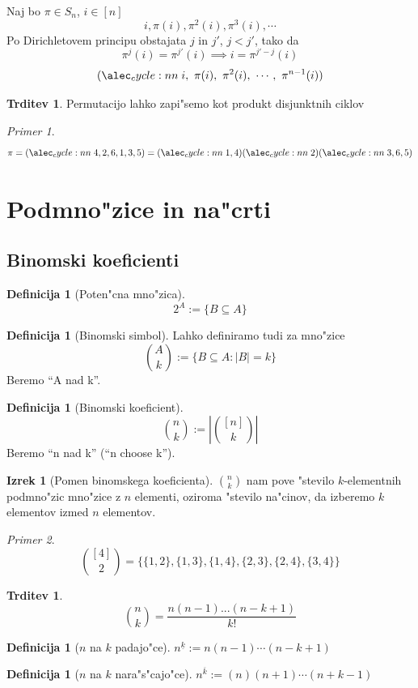 \documentclass[a4paper,12pt]{article}
\theoremstyle{definition}
\newtheorem{defn}[counter]{Definicija}
\newtheorem{claim}[counter]{Trditev}
\newtheorem{theorem}[counter]{Izrek}
\theoremstyle{remark}
\newtheorem*{ex}{Primer}
\begin{document}
\label{TODO: what is this}
Naj bo $\pi \in S_n$, $i \in [n]$
\[i, \pi (i), \pi^2(i), \pi^3(i), \cdots\]
Po Dirichletovem principu obstajata $j$ in $j'$, $j < j'$, tako da
\[ \pi^j(i) = \pi^{j'}(i) \implies i = \pi^{j'-j}(i) \]
\[\cycle{i,\ \pi(i),\ \pi^2(i),\ \cdots,\ \pi^{n - 1}(i)}\]
\begin{claim}
	Permutacijo lahko zapi"semo kot produkt disjunktnih ciklov
\end{claim}
\begin{ex}
	\[\pi = \cycle{4,2,6,1,3,5} = \cycle{1, 4}\cycle{2}\cycle{3,6,5}\]
\end{ex}

\section{Podmno"zice in na"crti}
\subsection{Binomski koeficienti}
\begin{defn}[Poten"cna mno"zica]
	\[2^A := \{B \subseteq A\}\]
\end{defn}
\begin{defn}[Binomski simbol]
	Lahko definiramo tudi za mno"zice
	\[\binom{A}{k} := \{B \subseteq A: |B| = k\}\]
	Beremo ``A  nad k''.
\end{defn}
\begin{defn}[Binomski koeficient]
	\[\binom{n}{k} := |\binom{[n]}{k}|\]
	Beremo ``n nad k'' (``n choose k'').
\end{defn}

\begin{theorem}[Pomen binomskega koeficienta]
	$\binom{n}{k}$ nam pove "stevilo $k$-elementnih podmno"zic mno"zice z $n$ elementi, oziroma "stevilo na"cinov, da izberemo $k$ elementov izmed $n$ elementov.
\end{theorem}
\begin{ex}
	\[\binom{[4]}{2} = \{\{1, 2\}, \{1, 3\}, \{1, 4\}, \{2, 3\}, \{2, 4\}, \{3, 4\}\}\]
\end{ex}

\begin{claim}
	\[\binom{n}{k}=\frac{n(n-1)...(n-k+1)}{k!}\]
\end{claim}
\begin{defn}[$n$ na $k$ padajo"ce]
	$n^{\underline{k}} := n(n-1)\cdots(n-k+1)$\\
\end{defn}
\begin{defn}[$n$ na $k$ nara"s"cajo"ce]
	$n^{\overline{k}} := (n)(n+1)\cdots(n+k-1)$
\end{defn}
\end{document}

